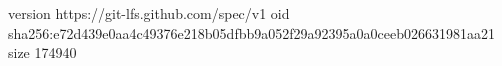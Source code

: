 version https://git-lfs.github.com/spec/v1
oid sha256:e72d439e0aa4c49376e218b05dfbb9a052f29a92395a0a0ceeb026631981aa21
size 174940
